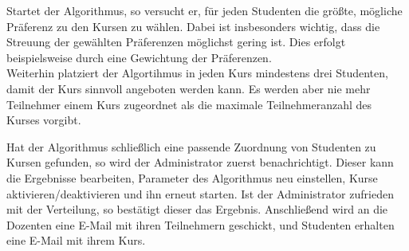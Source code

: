 \documentclass[12pt,a4paper]{article}
\begin{document}
    Startet der Algorithmus, so versucht er, für jeden Studenten die größte, mögliche Präferenz zu den Kursen zu wählen. Dabei ist insbesonders wichtig, dass die Streuung der gewählten Präferenzen möglichst gering ist. Dies erfolgt beispielsweise durch eine Gewichtung der Präferenzen.\\
    Weiterhin platziert der Algortihmus in jeden Kurs mindestens drei Studenten, damit der Kurs sinnvoll angeboten werden kann. Es werden aber nie mehr Teilnehmer einem Kurs zugeordnet als die maximale Teilnehmeranzahl des Kurses vorgibt.
    
    Hat der Algorithmus schließlich eine passende Zuordnung von Studenten zu Kursen gefunden, so wird der Administrator zuerst benachrichtigt. Dieser kann die Ergebnisse bearbeiten, Parameter des Algorithmus neu einstellen, Kurse aktivieren/deaktivieren und ihn erneut starten. Ist der Administrator zufrieden mit der Verteilung, so bestätigt dieser das Ergebnis. Anschließend wird an die Dozenten eine E-Mail mit ihren Teilnehmern geschickt, und Studenten erhalten eine E-Mail mit ihrem Kurs.
    
\end{document}
